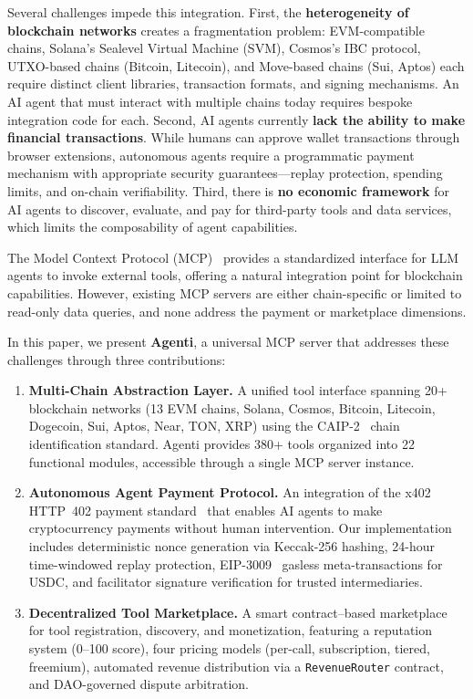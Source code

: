 \documentclass[11pt]{article}
\begin{document}
Several challenges impede this integration. First, the \textbf{heterogeneity of blockchain networks} creates a fragmentation problem: EVM-compatible chains, Solana's Sealevel Virtual Machine (SVM), Cosmos's IBC protocol, UTXO-based chains (Bitcoin, Litecoin), and Move-based chains (Sui, Aptos) each require distinct client libraries, transaction formats, and signing mechanisms. An AI agent that must interact with multiple chains today requires bespoke integration code for each. Second, AI agents currently \textbf{lack the ability to make financial transactions}. While humans can approve wallet transactions through browser extensions, autonomous agents require a programmatic payment mechanism with appropriate security guarantees---replay protection, spending limits, and on-chain verifiability. Third, there is \textbf{no economic framework} for AI agents to discover, evaluate, and pay for third-party tools and data services, which limits the composability of agent capabilities.

The Model Context Protocol (MCP)~\cite{anthropic2024mcp} provides a standardized interface for LLM agents to invoke external tools, offering a natural integration point for blockchain capabilities. However, existing MCP servers are either chain-specific or limited to read-only data queries, and none address the payment or marketplace dimensions.

In this paper, we present \textbf{Agenti}, a universal MCP server that addresses these challenges through three contributions:

\begin{enumerate}[leftmargin=*]
  \item \textbf{Multi-Chain Abstraction Layer.} A unified tool interface spanning 20+ blockchain networks (13 EVM chains, Solana, Cosmos, Bitcoin, Litecoin, Dogecoin, Sui, Aptos, Near, TON, XRP) using the CAIP-2~\cite{caip2} chain identification standard. Agenti provides 380+ tools organized into 22 functional modules, accessible through a single MCP server instance.

  \item \textbf{Autonomous Agent Payment Protocol.} An integration of the x402 HTTP~402 payment standard~\cite{coinbase2024x402} that enables AI agents to make cryptocurrency payments without human intervention. Our implementation includes deterministic nonce generation via Keccak-256 hashing, 24-hour time-windowed replay protection, EIP-3009~\cite{eip3009} gasless meta-transactions for USDC, and facilitator signature verification for trusted intermediaries.

  \item \textbf{Decentralized Tool Marketplace.} A smart contract--based marketplace for tool registration, discovery, and monetization, featuring a reputation system (0--100 score), four pricing models (per-call, subscription, tiered, freemium), automated revenue distribution via a \texttt{RevenueRouter} contract, and DAO-governed dispute arbitration.
\end{enumerate}
\end{document}
